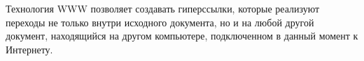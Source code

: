 \documentclass[t]{beamer}  %
\begin{document}
\begin{frame}
	\frametitle{\insertsection} 
	\framesubtitle{\insertsubsection}
	\parindent=1cm \alert{Технология WWW} позволяет создавать гиперссылки, которые реализуют переходы не только внутри исходного документа, но и на любой другой документ, находящийся на другом компьютере, подключенном в данный момент к Интернету.

\begin{figure}
\begin{center}
\begin{minipage}[h]{0.5\linewidth}
  \\
\end{minipage}
\end{center}
\end{figure}

\end{frame}
\end{document}
